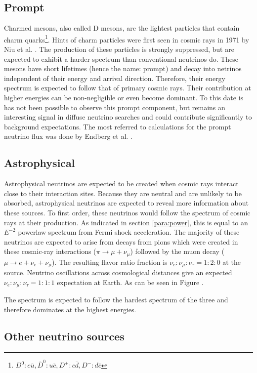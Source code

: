 \subsection{Prompt}
Charmed mesons, also called D mesons, are the lightest particles that contain charm quarks\footnote{$D^0: c\bar{u}, \bar{D}^0: u\bar{c}, D^+: c\bar{d}, D^-: d\bar{c}$}. Hints of charm particles were first seen in cosmic rays in 1971 by Niu et al. \cite{doi:10.1143/PTP.46.1644}. The production of these particles is strongly suppressed, but are expected to exhibit a harder spectrum than conventional neutrinos do. These mesons have short lifetimes (hence the name: prompt) and decay into netrinos independent of their energy and arrival direction. Therefore, their energy spectrum is expected to follow that of primary cosmic rays. Their contribution at higher energies can be non-negligible or even become dominant. To this date is has not been possible to observe this prompt component, but remains an interesting signal in diffuse neutrino searches and could contribute significantly to background expectations.  The most referred to calculations for the prompt neutrino flux was done by Endberg et al. \cite{Enberg:2008te}.
\subsection{Astrophysical}
\label{subsec:astro}
Astrophysical neutrinos are expected to be created when cosmic rays interact close to their interaction sites. Because they are neutral and are unlikely to be absorbed, astrophysical neutrinos are expected to reveal more information about these sources. To first order, these neutrinos would follow the spectrum of cosmic rays at their production. As indicated in section \ref{para:power}, this is equal to an $E^{-2}$ powerlaw spectrum from Fermi shock acceleration. The majority of these neutrinos are expected to arise from decays from pions which were created in these cosmic-ray interactions ($\pi \rightarrow \mu + \nu_\mu$) followed by the muon decay ($\mu \rightarrow e + \nu_e + \nu_\mu$). The resulting flavor ratio fraction is $\nu_e: \nu_\mu: \nu_\tau = 1:2:0$ at the source. Neutrino oscillations across cosmological distances give an expected $\nu_e: \nu_\mu: \nu_\tau = 1:1:1$ expectation at Earth. As can be seen in Figure \cite{fig:neutrinospectrum2}.

The spectrum is expected to follow the hardest spectrum of the three and therefore dominates at the highest energies.

\subsection{Other neutrino sources}
